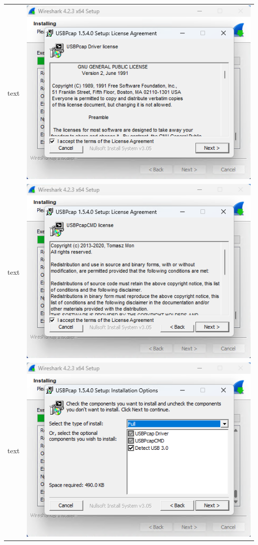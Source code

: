 \documentclass[11pt,a4paper]{report}
\begin{document}
\begin{tabular}{ l r }
            text & \includegraphics[scale=1.0]{wireshark15} \\
            text & \includegraphics[scale=1.0]{wireshark16} \\
            text & \includegraphics[scale=1.0]{wireshark17} \\

\end{tabular}
\end{document}
